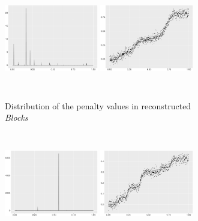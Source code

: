 \begin{figure}
    \centering
    \begin{subfigure}{\textwidth}
    \centering
    \includegraphics[width=0.45\textwidth,height=4.5cm]{Chapters/02TractorSplineTheory/plot/ggplot/ggBlocksPenaltyBar.pdf}
    \includegraphics[width=0.45\textwidth,height=4.5cm]{Chapters/02TractorSplineTheory/plot/ggplot/ggBlocksPenaltyLine.pdf}
    \caption{Distribution of the penalty values in reconstructed \textit{Blocks}}
    \end{subfigure}
    \begin{subfigure}{\textwidth}
    \centering
    \includegraphics[width=0.45\textwidth,height=4.5cm]{Chapters/02TractorSplineTheory/plot/ggplot/ggBumpsPenaltyBar.pdf}
    \includegraphics[width=0.45\textwidth,height=4.5cm]{Chapters/02TractorSplineTheory/plot/ggplot/ggBumpsPenaltyLine.pdf}

\end{subfigure}
\end{figure}
